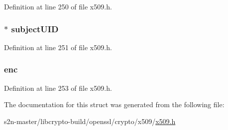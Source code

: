 Definition at line 250 of file x509.\+h.

\subsubsection[{\texorpdfstring{subject\+U\+ID}{subjectUID}}]{ $\ast$ subject\+U\+ID}\hypertarget{structx509__cinf__st_ad8c67cb362ddcccf1bbc991a7ba13bf3}{}\label{structx509__cinf__st_ad8c67cb362ddcccf1bbc991a7ba13bf3}


Definition at line 251 of file x509.\+h.

\subsubsection[{\texorpdfstring{enc}{enc}}]{ enc}\hypertarget{structx509__cinf__st_a6d03127d2bcfc5727232717a5ba76f91}{}\label{structx509__cinf__st_a6d03127d2bcfc5727232717a5ba76f91}


Definition at line 253 of file x509.\+h.



The documentation for this struct was generated from the following file\+:\begin{DoxyCompactItemize}
\item 
s2n-\/master/libcrypto-\/build/openssl/crypto/x509/\hyperlink{crypto_2x509_2x509_8h}{x509.\+h}\end{DoxyCompactItemize}
